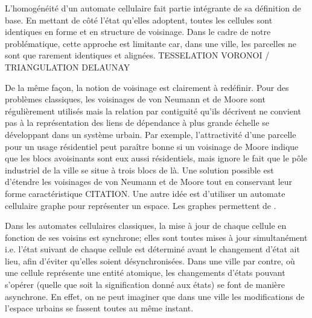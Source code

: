 \documentclass[10pt,twocolumn]{article}
\begin{document}
L'homogénéité d'un automate cellulaire fait partie intégrante de sa
définition de base. En mettant de côté l'état qu'elles adoptent,
toutes les cellules sont identiques en forme et en structure de
voisinage. Dans le cadre de notre problématique, cette approche est
limitante car, dans une ville, les parcelles ne sont que rarement
identiques et alignées. TESSELATION VORONOI / TRIANGULATION DELAUNAY

De la même façon, la notion de voisinage est clairement à
redéfinir. Pour des problèmes classiques, les voisinages de von
Neumann et de Moore sont régulièrement utilisés mais la relation par
contiguité qu'ils décrivent ne convient pas à la représentation des
liens de dépendance à plus grande échelle se développant dans un
système urbain. Par exemple, l'attractivité d'une parcelle pour un
usage résidentiel peut paraître bonne si un voisinage de Moore indique
que les blocs avoisinants sont eux aussi résidentiels, mais ignore le
fait que le pôle industriel de la ville se situe à trois
blocs de là. Une solution possible est d'étendre les voisinages de von
Neumann et de Moore tout en conservant leur forme caractéristique
CITATION. Une autre idée est d'utiliser un automate cellulaire graphe
pour représenter un espace. Les graphes permettent de \cite{0'Sullivan2001}.

Dans les automates cellulaires classiques, la mise à jour de chaque
cellule en fonction de ses voisins est synchrone; elles sont toutes
mises à jour simultanément i.e. l'état suivant de chaque cellule est
déterminé avant le changement d'état ait lieu, afin d'éviter qu'elles
soient désynchronisées. Dans une ville par contre, où une cellule
représente une entité atomique, les changements d'états pouvant
s'opérer (quelle que soit la signification donné aux états) se font de
manière asynchrone. En effet, on ne peut imaginer que dans une ville
les modifications de l'espace urbains se fassent toutes au même
instant.

\printbibliography
\end{document}
